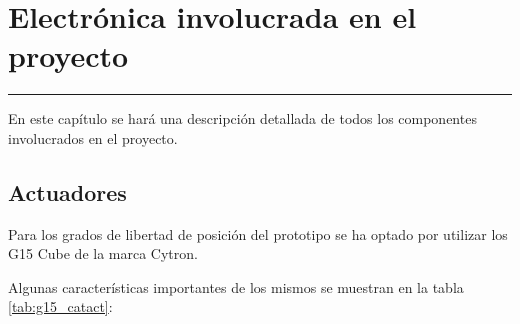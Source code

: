 \chapter{Electrónica involucrada en el proyecto} \label{chap:Electronica}
\hrule
\vspace{3mm}
En este capítulo se hará una descripción detallada de todos los componentes involucrados en el proyecto.

\section{Actuadores} \label{sec:Electronica:Actuadores}
\label{sec:Electronica:Actuadores:G15}

    Para los grados de libertad de posición del prototipo se ha optado por utilizar los  G15 Cube de la marca Cytron.
    
    Algunas características importantes de los mismos se muestran en la tabla \ref{tab:g15_catact}:
    
